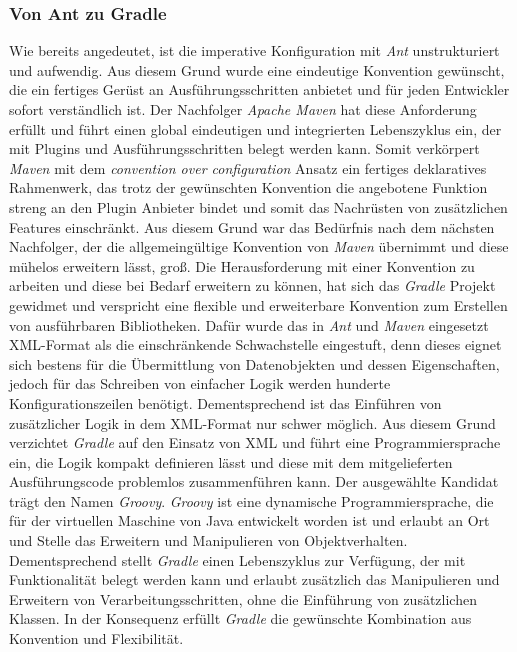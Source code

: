 		\subsubsection{Von Ant zu Gradle}%
		Wie bereits angedeutet, ist die imperative Konfiguration mit \textit{Ant} unstrukturiert und aufwendig. Aus diesem Grund wurde eine eindeutige Konvention gewünscht, die ein fertiges Gerüst an Ausführungsschritten anbietet und für jeden Entwickler sofort verständlich ist. Der Nachfolger \textit{Apache Maven} hat diese Anforderung erfüllt und führt einen global eindeutigen und integrierten Lebenszyklus ein, der mit Plugins und Ausführungsschritten belegt werden kann. Somit verkörpert \textit{Maven} mit dem \textit{convention over configuration} Ansatz ein fertiges deklaratives Rahmenwerk, das trotz der gewünschten Konvention die angebotene Funktion streng an den Plugin Anbieter bindet und somit das Nachrüsten von zusätzlichen Features einschränkt. Aus diesem Grund war das Bedürfnis nach dem nächsten Nachfolger, der die allgemeingültige Konvention von \textit{Maven} übernimmt und diese mühelos erweitern lässt, groß.\bigbreak
		Die Herausforderung mit einer Konvention zu arbeiten und diese bei Bedarf erweitern zu können, hat sich das \textit{Gradle} Projekt gewidmet und verspricht eine flexible und erweiterbare Konvention zum Erstellen von ausführbaren Bibliotheken.\newline
		Dafür wurde das in \textit{Ant} und \textit{Maven} eingesetzt XML-Format als die einschränkende Schwachstelle eingestuft, denn dieses eignet sich bestens für die Übermittlung von Datenobjekten und dessen Eigenschaften, jedoch für das Schreiben von einfacher Logik werden hunderte Konfigurationszeilen benötigt. Dementsprechend ist das Einführen von zusätzlicher Logik in dem XML-Format nur schwer möglich. Aus diesem Grund verzichtet \textit{Gradle} auf den Einsatz von XML und führt eine Programmiersprache ein, die Logik kompakt definieren lässt und diese mit dem mitgelieferten Ausführungscode problemlos zusammenführen kann. \newline
		Der ausgewählte Kandidat trägt den Namen \textit{Groovy}. \textit{Groovy} ist eine dynamische Programmiersprache, die für der virtuellen Maschine von Java entwickelt worden ist und erlaubt an Ort und Stelle das Erweitern und Manipulieren von Objektverhalten.\newline
		Dementsprechend stellt \textit{Gradle} einen Lebenszyklus zur Verfügung, der mit Funktionalität belegt werden kann und erlaubt zusätzlich das Manipulieren und Erweitern von Verarbeitungsschritten, ohne die Einführung von zusätzlichen Klassen. In der Konsequenz erfüllt \textit{Gradle} die gewünschte Kombination aus Konvention und Flexibilität.
		
